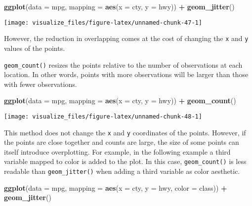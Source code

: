 \documentclass[]{book}
\newenvironment{Shaded}{\begin{snugshade}}{\end{snugshade}}
\newcommand{\DataTypeTok}[1]{\textcolor[rgb]{0.13,0.29,0.53}{#1}}
\newcommand{\KeywordTok}[1]{\textcolor[rgb]{0.13,0.29,0.53}{\textbf{#1}}}
\newcommand{\NormalTok}[1]{#1}
\newcommand{\OperatorTok}[1]{\textcolor[rgb]{0.81,0.36,0.00}{\textbf{#1}}}
\newcommand{\StringTok}[1]{\textcolor[rgb]{0.31,0.60,0.02}{#1}}
\theoremstyle{plain}
\theoremstyle{remark}
\begin{document}
\begin{Shaded}
\begin{Highlighting}[]
\KeywordTok{ggplot}\NormalTok{(}\DataTypeTok{data =}\NormalTok{ mpg, }\DataTypeTok{mapping =} \KeywordTok{aes}\NormalTok{(}\DataTypeTok{x =}\NormalTok{ cty, }\DataTypeTok{y =}\NormalTok{ hwy)) }\OperatorTok{+}
\StringTok{  }\KeywordTok{geom_jitter}\NormalTok{()}
\end{Highlighting}
\end{Shaded}

\begin{center}\texttt{[image: visualize\_files/figure-latex/unnamed-chunk-47-1]} \end{center}

However, the reduction in overlapping comes at the cost of changing the
\texttt{x} and \texttt{y} values of the points.

\texttt{geom\_count()} resizes the points relative to the number of
observations at each location. In other words, points with more
observations will be larger than those with fewer observations.

\begin{Shaded}
\begin{Highlighting}[]
\KeywordTok{ggplot}\NormalTok{(}\DataTypeTok{data =}\NormalTok{ mpg, }\DataTypeTok{mapping =} \KeywordTok{aes}\NormalTok{(}\DataTypeTok{x =}\NormalTok{ cty, }\DataTypeTok{y =}\NormalTok{ hwy)) }\OperatorTok{+}
\StringTok{  }\KeywordTok{geom_count}\NormalTok{()}
\end{Highlighting}
\end{Shaded}

\begin{center}\texttt{[image: visualize\_files/figure-latex/unnamed-chunk-48-1]} \end{center}

This method does not change the \texttt{x} and \texttt{y} coordinates of
the points. However, if the points are close together and counts are
large, the size of some points can itself introduce overplotting. For
example, in the following example a third variable mapped to color is
added to the plot. In this case, \texttt{geom\_count()} is less readable
than \texttt{geom\_jitter()} when adding a third variable as color
aesthetic.

\begin{Shaded}
\begin{Highlighting}[]
\KeywordTok{ggplot}\NormalTok{(}\DataTypeTok{data =}\NormalTok{ mpg, }\DataTypeTok{mapping =} \KeywordTok{aes}\NormalTok{(}\DataTypeTok{x =}\NormalTok{ cty, }\DataTypeTok{y =}\NormalTok{ hwy, }\DataTypeTok{color =}\NormalTok{ class)) }\OperatorTok{+}
\StringTok{  }\KeywordTok{geom_jitter}\NormalTok{()}
\end{Highlighting}
\end{Shaded}
\end{document}
